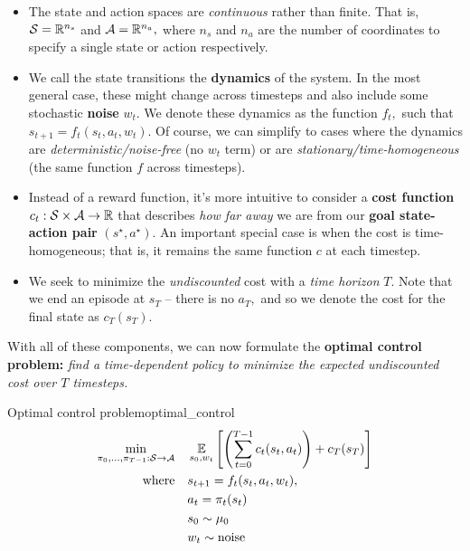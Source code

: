 \documentclass[../main/main]{subfiles}
\begin{document}
\begin{itemize}
    \item The state and action spaces are \emph{continuous} rather than finite. That is, $\mathcal{S} = \mathbb{R}^{n_s}$ and $\mathcal{A} = \mathbb{R}^{n_a},$ where $n_s$ and $n_a$ are the number of coordinates to specify a single state or action respectively.
    \item We call the state transitions the \textbf{dynamics} of the system. In the most general case, these might change across timesteps and also include some stochastic \textbf{noise} $w_t.$ We denote these dynamics as the function $f_t,$ such that $s_{t+1} = f_t(s_t, a_t, w_t).$ Of course, we can simplify to cases where the dynamics are \emph{deterministic/noise-free} (no $w_t$ term) or are \emph{stationary/time-homogeneous} (the same function $f$ across timesteps).
    \item Instead of a reward function, it's more intuitive to consider a \textbf{cost function} $c_t: \mathcal{S} \times \mathcal{A} \to \mathbb{R}$ that describes \emph{how far away} we are from our \textbf{goal state-action pair} $(s^\star, a^\star)$. An important special case is when the cost is time-homogeneous; that is, it remains the same function $c$ at each timestep.
    \item We seek to minimize the \emph{undiscounted} cost with a \emph{time horizon} $T$. Note that we end an episode at $s_T$ -- there is no $a_T,$ and so we denote the cost for the final state as $c_T(s_T).$
\end{itemize}

With all of these components, we can now formulate the \textbf{optimal control problem:} \emph{find a time-dependent policy to minimize the expected undiscounted cost over $T$ timesteps.}

\begin{definition}{Optimal control problem}{optimal_control}
    \begin{equation}
        \begin{split}
            \min_{\pi_0, \dots, \pi_{T-1} : \mathcal{S} \to \mathcal{A}} \quad & \operatorname*{\mathbb{E}}_{s_0, w_t} \left[
                \left( \sum_{t=0}^{T-1} c_t(s_t, a_t) \right) + c_T(s_T)
            \right] \\
            \text{where} \quad & s_{t+1} = f_t(s_t, a_t, w_t), \\
            & a_t = \pi_t(s_t) \\
            & s_0 \sim \mu_0 \\
            & w_t \sim \text{noise}
        \end{split}
    \end{equation}
\end{definition}
\end{document}
